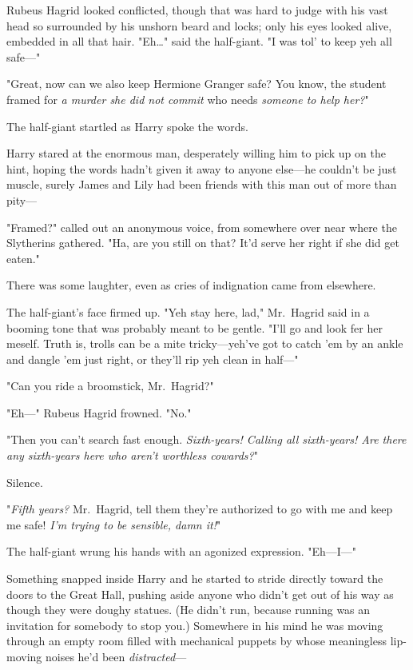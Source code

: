 Rubeus Hagrid looked conflicted, though that was hard to judge with his vast 
head so surrounded by his unshorn beard and locks; only his eyes looked alive, 
embedded in all that hair. "Eh{\ldots}" said the half-giant. "I was tol' to 
keep yeh all safe---"

"Great, now can we also keep Hermione Granger safe? You know, the student 
framed for \emph{a murder she did not commit} who needs \emph{someone to help 
her?}"

The half-giant startled as Harry spoke the words.

Harry stared at the enormous man, desperately willing him to pick up on the 
hint, hoping the words hadn't given it away to anyone else---he couldn't be 
just muscle, surely James and Lily had been friends with this man out of more 
than pity---

"Framed?" called out an anonymous voice, from somewhere over near where the 
Slytherins gathered. "Ha, are you still on that? It'd serve her right if she 
did get eaten."

There was some laughter, even as cries of indignation came from elsewhere.

The half-giant's face firmed up. "Yeh stay here, lad," Mr.~Hagrid said in a 
booming tone that was probably meant to be gentle. "I'll go and look fer her 
meself. Truth is, trolls can be a mite tricky---yeh've got to catch 'em by an 
ankle and dangle 'em just right, or they'll rip yeh clean in half---"

"Can you ride a broomstick, Mr.~Hagrid?"

"Eh---" Rubeus Hagrid frowned. "No."

"Then you can't search fast enough. \emph{Sixth-years! Calling all sixth-years! 
Are there any sixth-years here who aren't worthless cowards?}"

Silence.

"\emph{Fifth years?} Mr.~Hagrid, tell them they're authorized to go with me and 
keep me safe! \emph{I'm trying to be sensible, damn it!}"

The half-giant wrung his hands with an agonized expression. "Eh---I---"

Something snapped inside Harry and he started to stride directly toward the 
doors to the Great Hall, pushing aside anyone who didn't get out of his way as 
though they were doughy statues. (He didn't run, because running was an 
invitation for somebody to stop you.) Somewhere in his mind he was moving 
through an empty room filled with mechanical puppets by whose meaningless 
lip-moving noises he'd been \emph{distracted}---

